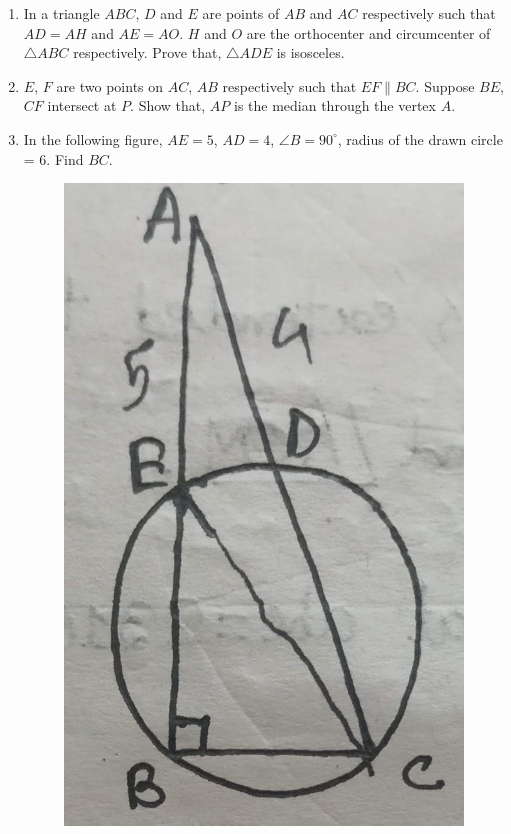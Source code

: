 \documentclass[11pt, a4paper]{article}
\begin{document}
\begin{enumerate}
	\item In a triangle $ABC$, $D$ and $E$ are points of $AB$ and $AC$ respectively such that $AD = AH$ and $AE = AO$. $H$ and $O$ are the orthocenter and circumcenter of $\bigtriangleup ABC$ respectively. Prove that, $\bigtriangleup ADE$ is isosceles.
	
	\item $E$, $F$ are two points on $AC$, $AB$ respectively such that $EF \parallel BC$. Suppose $BE$, $CF$ intersect at $P$. Show that, $AP$ is the median through the vertex $A$.
	
	\item In the following figure, $AE = 5$, $AD = 4$, $\angle B = 90^{\circ}$, radius of the drawn circle = 6. Find $BC$.
	\begin{figure}[h]
	\centering
	\includegraphics[scale=0.15]{IMG_20231102_173356_826}
	\end{figure}


\end{enumerate}
\end{document}
